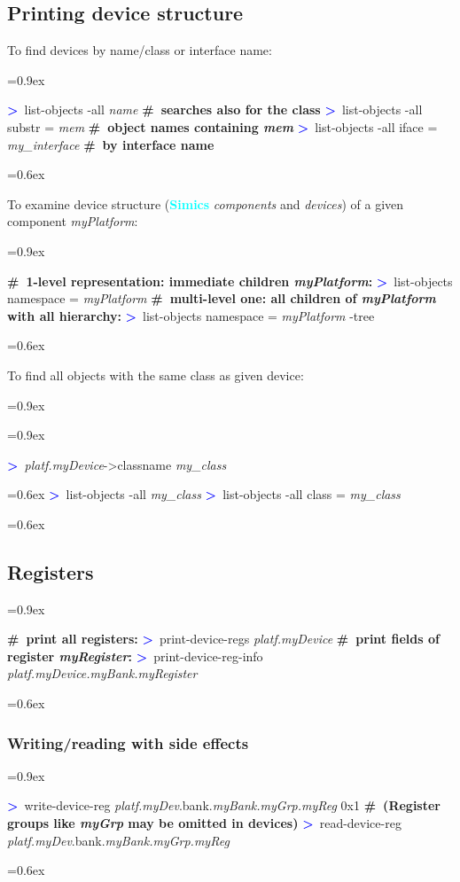\documentclass[8pt]{extarticle}
\newenvironment{code}[1][]{%
\begin{prebox}[#1]\obeylines%
\fontdimen2\font=0.9ex%
}{%
\end{prebox}%
\fontdimen2\font=0.6ex%
}
\newcommand{\ind}{\hphantom{~~~}}
\newcommand{\sprompt}{\textcolor{blue}{\textbf{>}\ }}
\newcommand{\cmtcommon}[1]{\textcolor{Sepia}{\textbf{#1}}}
\newcommand{\cmt}[1]{\cmtcommon{\#\ #1}}
\newcommand{\p}[1]{\textit{\large#1}}
\newcommand{\Simics}{\textcolor{cyan}{\textbf{Simics}}}
\begin{document}
\begin{multicols*}{3}
\subsection{Printing device structure}
To find devices by name/class or interface name:
    \begin{code}
        \sprompt list-objects -all \p{name} \ind \cmt{searches also for the class}
        \sprompt list-objects -all substr = \p{mem} \cmt{object names containing \p{mem}}
        \sprompt list-objects -all iface = \p{my_interface} \cmt{by interface name}
    \end{code}

To examine device structure (\Simics{} \textit{components}
and \textit{devices}) of a given component \p{myPlatform}:
\begin{code}
    \cmt{1-level representation: immediate children \p{myPlatform}:}
    \sprompt list-objects namespace = \p{myPlatform}
    \cmt{multi-level one: all children of \p{myPlatform} with all hierarchy:}
    \sprompt list-objects namespace = \p{myPlatform} -tree
\end{code}

To find all objects with the same class as given device:
        \begin{code}
            \begin{code}
            \sprompt \p{platf.myDevice}->classname
            \p{my_class}
            \end{code}
            \sprompt list-objects -all \p{my_class}
            \sprompt list-objects -all class = \p{my_class}
        \end{code}

\subsection{Registers}
\begin{code}
    \cmt{print all registers:}
    \sprompt print-device-regs \p{platf.myDevice}
    \cmt{print fields of register \p{myRegister}:}
    \sprompt print-device-reg-info \p{platf.myDevice.myBank.myRegister}
\end{code}

\subsubsection{Writing/reading with side effects}

\begin{code}
    \sprompt write-device-reg
    \ind \ind \p{platf.myDev}.bank.\p{myBank.myGrp.myReg} 0x1
    \cmt{(Register groups like \p{myGrp} may be omitted in devices)}
    \sprompt read-device-reg \p{platf.myDev}.bank.\p{myBank.myGrp.myReg}
\end{code}


\end{multicols*}
\end{document}
